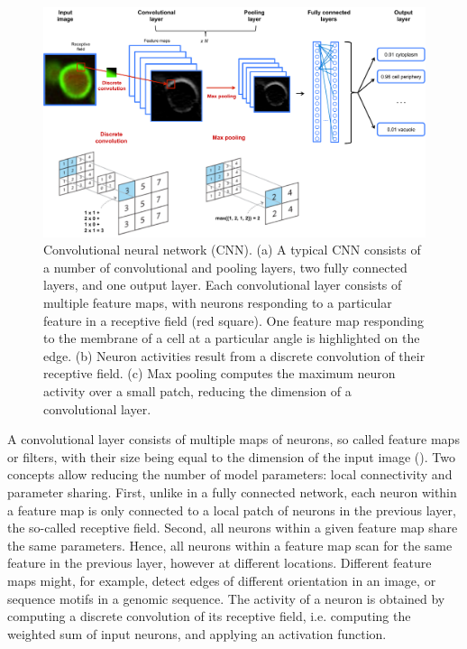 \begin{figure}[htbp!]
\centering
\includegraphics[width=1.0\textwidth]{cnn}
\caption[Convolutional neural network (CNN).]{Convolutional neural network (CNN). (a) A typical CNN consists of a number of convolutional and pooling layers, two fully connected layers, and one output layer. Each convolutional layer consists of multiple feature maps, with neurons responding to a particular feature in a receptive field (red square). One feature map responding to the membrane of a cell at a particular angle is highlighted on the edge. (b) Neuron activities result from a discrete convolution of their receptive field. (c) Max pooling computes the maximum neuron activity over a small patch, reducing the dimension of a convolutional layer.}
\label{fig:dl_cnn}
\end{figure}

A convolutional layer consists of multiple maps of neurons, so called feature maps or filters, with their size being equal to the dimension of the input image (). Two concepts allow reducing the number of model parameters: local connectivity and parameter sharing. First, unlike in a fully connected network, each neuron within a feature map is only connected to a local patch of neurons in the previous layer, the so-called receptive field. Second, all neurons within a given feature map share the same parameters. Hence, all neurons within a feature map scan for the same feature in the previous layer, however at different locations. Different feature maps might, for example, detect edges of different orientation in an image, or sequence motifs in a genomic sequence. The activity of a neuron is obtained by computing a discrete convolution of its receptive field, i.e. computing the weighted sum of input neurons, and applying an activation function.

